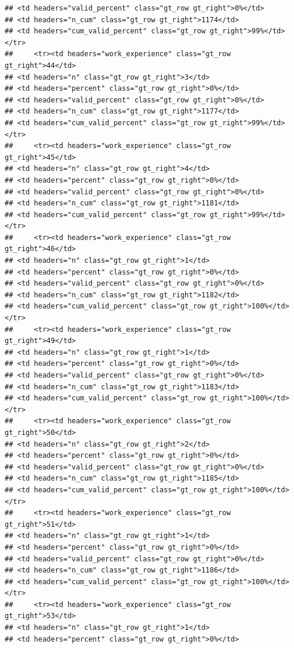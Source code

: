 \documentclass[
  a4paper,
  DIV=11,
  numbers=noendperiod]{scrartcl}
\begin{document}
\begin{verbatim}
## <td headers="valid_percent" class="gt_row gt_right">0%</td>
## <td headers="n_cum" class="gt_row gt_right">1174</td>
## <td headers="cum_valid_percent" class="gt_row gt_right">99%</td></tr>
##     <tr><td headers="work_experience" class="gt_row gt_right">44</td>
## <td headers="n" class="gt_row gt_right">3</td>
## <td headers="percent" class="gt_row gt_right">0%</td>
## <td headers="valid_percent" class="gt_row gt_right">0%</td>
## <td headers="n_cum" class="gt_row gt_right">1177</td>
## <td headers="cum_valid_percent" class="gt_row gt_right">99%</td></tr>
##     <tr><td headers="work_experience" class="gt_row gt_right">45</td>
## <td headers="n" class="gt_row gt_right">4</td>
## <td headers="percent" class="gt_row gt_right">0%</td>
## <td headers="valid_percent" class="gt_row gt_right">0%</td>
## <td headers="n_cum" class="gt_row gt_right">1181</td>
## <td headers="cum_valid_percent" class="gt_row gt_right">99%</td></tr>
##     <tr><td headers="work_experience" class="gt_row gt_right">46</td>
## <td headers="n" class="gt_row gt_right">1</td>
## <td headers="percent" class="gt_row gt_right">0%</td>
## <td headers="valid_percent" class="gt_row gt_right">0%</td>
## <td headers="n_cum" class="gt_row gt_right">1182</td>
## <td headers="cum_valid_percent" class="gt_row gt_right">100%</td></tr>
##     <tr><td headers="work_experience" class="gt_row gt_right">49</td>
## <td headers="n" class="gt_row gt_right">1</td>
## <td headers="percent" class="gt_row gt_right">0%</td>
## <td headers="valid_percent" class="gt_row gt_right">0%</td>
## <td headers="n_cum" class="gt_row gt_right">1183</td>
## <td headers="cum_valid_percent" class="gt_row gt_right">100%</td></tr>
##     <tr><td headers="work_experience" class="gt_row gt_right">50</td>
## <td headers="n" class="gt_row gt_right">2</td>
## <td headers="percent" class="gt_row gt_right">0%</td>
## <td headers="valid_percent" class="gt_row gt_right">0%</td>
## <td headers="n_cum" class="gt_row gt_right">1185</td>
## <td headers="cum_valid_percent" class="gt_row gt_right">100%</td></tr>
##     <tr><td headers="work_experience" class="gt_row gt_right">51</td>
## <td headers="n" class="gt_row gt_right">1</td>
## <td headers="percent" class="gt_row gt_right">0%</td>
## <td headers="valid_percent" class="gt_row gt_right">0%</td>
## <td headers="n_cum" class="gt_row gt_right">1186</td>
## <td headers="cum_valid_percent" class="gt_row gt_right">100%</td></tr>
##     <tr><td headers="work_experience" class="gt_row gt_right">53</td>
## <td headers="n" class="gt_row gt_right">1</td>
## <td headers="percent" class="gt_row gt_right">0%</td>

\end{verbatim}
\end{document}
